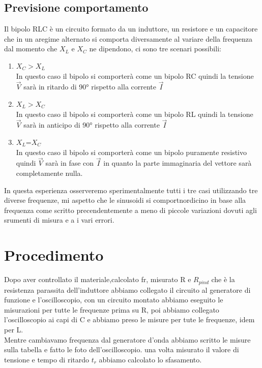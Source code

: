 \documentclass[12pt]{article}
\begin{document}
    \subsection{Previsione comportamento}
    Il bipolo RLC è un circuito formato da un induttore, un resistore e un capacitore che in un aregime alternato si 
    comporta diversamente al variare della frequenza dal momento che $X_L$ e $X_C$ ne dipendono, ci sono tre scenari possibili:
    \begin{enumerate}
        \item $X_C>X_L$\\
        In questo caso il bipolo si comporterà come un bipolo RC quindi la tensione $\vec{V}$ sarà in ritardo di 90° rispetto alla corrente $\vec{I}$
        \item $X_L>X_C$\\
        In questo caso il bipolo si comporterà come un bipolo RL quindi la tensione $\vec{V}$ sarà in anticipo di 90° rispetto alla corrente $\vec{I}$
        \item $X_L$=$X_C$\\
        In questo caso il bipolo si comporterà come un bipolo puramente resistivo quindi $\vec{V}$ sarà in fase con $\vec{I}$ in quanto la parte immaginaria del 
        vettore sarà completamente nulla.
        
    \end{enumerate}
    In questa esperienza osserveremo sperimentalmente tutti i tre casi utilizzando tre diverse frequenze, mi aspetto che 
    le sinusoidi si comportnordicino in base alla frequenza come scritto precendentemente a meno di piccole variazioni dovuti agli srumenti di 
    misura e a i vari errori.
\section{Procedimento}
   Dopo aver controllato il materiale,calcolato fr, misurato R e $R_{pind}$ che è la resistenza parassita dell'induttore abbiamo collegato il circuito al generatore
   di funzione e l'oscilloscopio, con un circuito montato abbiamo eseguito le misurazioni per tutte le frequenze prima su R, poi abbiamo collegato l'oscilloscopio ai capi
   di C e abbiamo preso le misure per tute le frequenze, idem per L.\\
   Mentre cambiavamo frequenza dal generatore d'onda abbiamo scritto le misure sulla tabella e fatto le foto dell'oscilloscopio.
   una volta misurato il valore di tensione e tempo di ritardo \textit{$t_r$} abbiamo calcolato lo sfasamento. 
   
\end{document}
